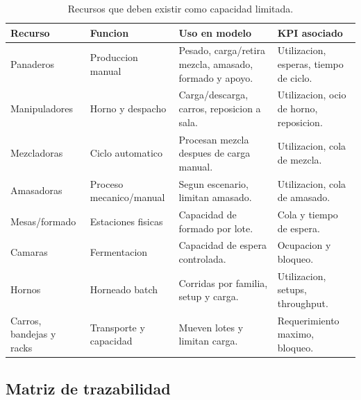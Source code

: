 \documentclass[12pt]{article}
\begin{document}
\begin{table}[H]
\centering
\caption{Recursos que deben existir como capacidad limitada.}
\begin{tabularx}{\textwidth}{@{}L{3.0cm}L{3.2cm}Y L{3.0cm}@{}}
\toprule
{}
\color{white}Recurso & \color{white}Funcion & \color{white}Uso en modelo & \color{white}KPI asociado \\
\midrule
Panaderos & Produccion manual & Pesado, carga/retira mezcla, amasado, formado y apoyo. & Utilizacion, esperas, tiempo de ciclo. \\
Manipuladores & Horno y despacho & Carga/descarga, carros, reposicion a sala. & Utilizacion, ocio de horno, reposicion. \\
Mezcladoras & Ciclo automatico & Procesan mezcla despues de carga manual. & Utilizacion, cola de mezcla. \\
Amasadoras & Proceso mecanico/manual & Segun escenario, limitan amasado. & Utilizacion, cola de amasado. \\
Mesas/formado & Estaciones fisicas & Capacidad de formado por lote. & Cola y tiempo de espera. \\
Camaras & Fermentacion & Capacidad de espera controlada. & Ocupacion y bloqueo. \\
Hornos & Horneado batch & Corridas por familia, setup y carga. & Utilizacion, setups, throughput. \\
Carros, bandejas y racks & Transporte y capacidad & Mueven lotes y limitan carga. & Requerimiento maximo, bloqueo. \\
\bottomrule
\end{tabularx}
\end{table}

\subsection{Matriz de trazabilidad}
\end{document}
